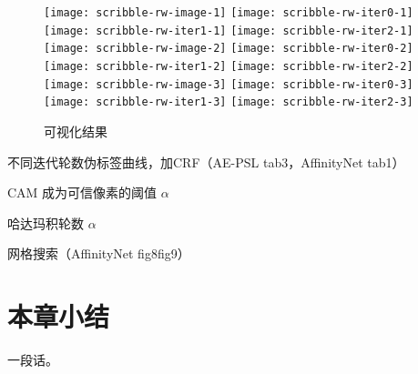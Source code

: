 \begin{figure}[h]
\centering
\texttt{[image: scribble-rw-image-1]}
\hfil
\texttt{[image: scribble-rw-iter0-1]}
\hfil
\texttt{[image: scribble-rw-iter1-1]}
\hfil
\texttt{[image: scribble-rw-iter2-1]}
\vfil
\texttt{[image: scribble-rw-image-2]}
\hfil
\texttt{[image: scribble-rw-iter0-2]}
\hfil
\texttt{[image: scribble-rw-iter1-2]}
\hfil
\texttt{[image: scribble-rw-iter2-2]}
\vfil
\texttt{[image: scribble-rw-image-3]}
\hfil
\texttt{[image: scribble-rw-iter0-3]}
\hfil
\texttt{[image: scribble-rw-iter1-3]}
\hfil
\texttt{[image: scribble-rw-iter2-3]}
\hfil
{}
\hfil
{}
\hfil
{}
\caption{可视化结果}
\label{fig:scribble-vis}
\end{figure}


不同迭代轮数伪标签曲线，加CRF（AE-PSL tab3，AffinityNet tab1）

CAM 成为可信像素的阈值 $\alpha$

哈达玛积轮数 $\alpha$

网格搜索（AffinityNet fig8fig9）

\section{本章小结}
一段话。
